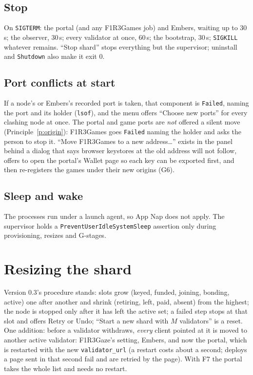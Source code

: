 \documentclass[11pt]{article}
\theoremstyle{definition}
\theoremstyle{remark}
\newcommand{\code}[1]{\texttt{#1}}
\newcommand{\Gz}{F1R3Gaze}
\newcommand{\Gm}{F1R3Games}
\newcommand{\Em}{Embers}
\begin{document}
\subsection{Stop}\label{sec:shutdown}
On \code{SIGTERM}: the portal (and any \Gm{} job) and \Em{}, waiting up to 30\,s; the
observer, 30\,s; every validator at once, 60\,s; the bootstrap, 30\,s;
\code{SIGKILL} whatever remains. ``Stop shard'' stops everything but the supervisor;
uninstall and \code{Shutdown} also make it exit 0.

\subsection{Port conflicts at start}\label{sec:portfail}
If a node's or \Em{}'s recorded port is taken, that component is \code{Failed},
naming the port and its holder (\code{lsof}), and the menu offers ``Choose new
ports'' for every clashing node at once. The portal and game ports are \emph{not}
offered a silent move (Principle~\ref{p:origin}): \Gm{} goes \code{Failed} naming the
holder and asks the person to stop it. ``Move \Gm{} to a new address\ldots''
exists in the panel behind a dialog that says browser keystores at the old address
will not follow, offers to open the portal's Wallet page so each key can be exported
first, and then re-registers the games under their new origins (G6).

\subsection{Sleep and wake}
The processes run under a launch agent, so App Nap does not apply. The supervisor
holds a \code{PreventUserIdleSystemSleep} assertion only during provisioning, resizes
and G-stages.

\section{Resizing the shard}\label{sec:resize}

Version 0.3's procedure stands: slots grow (keyed, funded, joining, bonding, active)
one after another and shrink (retiring, left, paid, absent) from the highest; the
node is stopped only after it has left the active set; a failed step stops at that
slot and offers Retry or Undo; ``Start a new shard with $M$ validators'' is a reset.
One addition: before a validator withdraws, \emph{every} client pointed at it is moved
to another active validator: \Gz{}'s setting, \Em{}, and now the portal, which is
restarted with the new \code{validator\_url} (a restart costs about a second;
deploys a page sent in that second fail and are retried by the page). With F7 the
portal takes the whole list and needs no restart.
\end{document}
